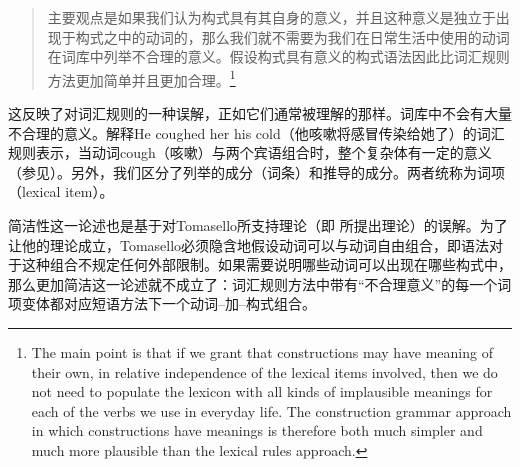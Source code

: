 \begin{quotation}
主要观点是如果我们认为构式具有其自身的意义，并且这种意义是独立于出现于构式之中的动词的，那么我们就不需要为我们在日常生活中使用的动词在词库中列举不合理的意义。假设构式具有意义的构式语法因此比词汇规则方法更加简单并且更加合理。\citep[]{Tomasello2003a}\footnote{%
The main point is that if we grant that constructions may have meaning of their own, in relative
independence of the lexical items involved, then we do not need to populate the lexicon with all
kinds of implausible meanings for each of the verbs we use in everyday life.  The construction
grammar approach in which constructions have meanings is therefore both much simpler and much more plausible than the lexical rules approach.}
\end{quotation}

\noindent
这反映了对词汇规则的一种误解，正如它们通常被理解的那样。词库中不会有大量不合理的意义。解释He coughed her his cold（他咳嗽将感冒传染给她了）的词汇规则表示，当动词cough（咳嗽）与两个宾语组合时，整个复杂体有一定的意义（参见\citealp[]{Mueller2006d}）。另外，我们区分了列举的成分（词条）和推导的成分。两者统称为词项（lexical item）。

    简洁性这一论述也是基于对Tomasello所支持理论（即 \citet{Goldberg95a, Goldberg2006a}所提出理论）的误解。为了让他的理论成立，Tomasello必须隐含地假设动词可以与动词自由组合，即语法对于这种组合不规定任何外部限制。如果需要说明哪些动词可以出现在哪些构式中，那么更加简洁这一论述就不成立了：词汇规则方法中带有“不合理意义”的每一个词项变体都对应短语方法下一个动词--加--构式组合。

